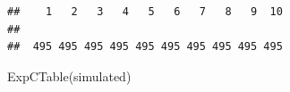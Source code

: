 \documentclass[
]{article}
\newenvironment{Shaded}{\begin{snugshade}}{\end{snugshade}}
\newcommand{\FunctionTok}[1]{\textcolor[rgb]{0.00,0.00,0.00}{#1}}
\newcommand{\NormalTok}[1]{#1}
\newcommand{\SpecialCharTok}[1]{\textcolor[rgb]{0.00,0.00,0.00}{#1}}
\begin{document}
\begin{Shaded}
\end{Shaded}

\begin{verbatim}
##    1   2   3   4   5   6   7   8   9  10
##                                         
##  495 495 495 495 495 495 495 495 495 495
\end{verbatim}

\begin{Shaded}
\begin{Highlighting}[]
  \FunctionTok{ExpCTable}\NormalTok{(simulated)}
\end{Highlighting}
\end{Shaded}
\end{document}
